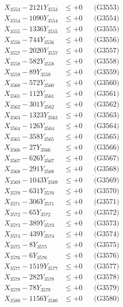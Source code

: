 \documentclass[a4paper,10pt]{article}
\begin{document}
{\begin{align}
X_{3553} - 2121Y_{3553} &\leq +0 && \text{(G3553)} \\
X_{3554} - 1090Y_{3554} &\leq +0 && \text{(G3554)} \\
X_{3555} - 1336Y_{3555} &\leq +0 && \text{(G3555)} \\
X_{3556} - 744Y_{3556} &\leq +0 && \text{(G3556)} \\
X_{3557} - 2020Y_{3557} &\leq +0 && \text{(G3557)} \\
X_{3558} - 582Y_{3558} &\leq +0 && \text{(G3558)} \\
X_{3559} - 89Y_{3559} &\leq +0 && \text{(G3559)} \\
X_{3560} - 572Y_{3560} &\leq +0 && \text{(G3560)} \\
\allowbreak
X_{3561} - 112Y_{3561} &\leq +0 && \text{(G3561)} \\
X_{3562} - 301Y_{3562} &\leq +0 && \text{(G3562)} \\
X_{3563} - 1323Y_{3563} &\leq +0 && \text{(G3563)} \\
X_{3564} - 126Y_{3564} &\leq +0 && \text{(G3564)} \\
X_{3565} - 358Y_{3565} &\leq +0 && \text{(G3565)} \\
X_{3566} - 27Y_{3566} &\leq +0 && \text{(G3566)} \\
X_{3567} - 626Y_{3567} &\leq +0 && \text{(G3567)} \\
X_{3568} - 291Y_{3568} &\leq +0 && \text{(G3568)} \\
X_{3569} - 1043Y_{3569} &\leq +0 && \text{(G3569)} \\
X_{3570} - 631Y_{3570} &\leq +0 && \text{(G3570)} \\
\allowbreak
X_{3571} - 306Y_{3571} &\leq +0 && \text{(G3571)} \\
X_{3572} - 65Y_{3572} &\leq +0 && \text{(G3572)} \\
X_{3573} - 389Y_{3573} &\leq +0 && \text{(G3573)} \\
X_{3574} - 439Y_{3574} &\leq +0 && \text{(G3574)} \\
X_{3575} - 8Y_{3575} &\leq +0 && \text{(G3575)} \\
X_{3576} - 6Y_{3576} &\leq +0 && \text{(G3576)} \\
X_{3577} - 1519Y_{3577} &\leq +0 && \text{(G3577)} \\
X_{3578} - 282Y_{3578} &\leq +0 && \text{(G3578)} \\
X_{3579} - 78Y_{3579} &\leq +0 && \text{(G3579)} \\
X_{3580} - 1156Y_{3580} &\leq +0 && \text{(G3580)} \\

\end{align}}
\end{document}
